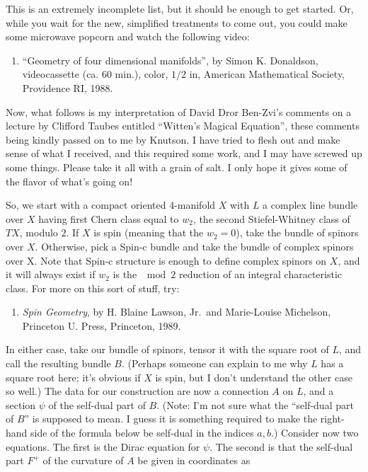 \documentclass{article}
\def\tightlist{}
\begin{document}
This is an extremely incomplete list, but it should be enough to get
started. Or, while you wait for the new, simplified treatments to come
out, you could make some microwave popcorn and watch the following
video:

\begin{enumerate}
\def\labelenumi{\arabic{enumi})}
\setcounter{enumi}{1}
\tightlist
\item
  ``Geometry of four dimensional manifolds'', by Simon K. Donaldson,
  videocassette (ca. 60 min.), color, \(1/2\) in, American Mathematical
  Society, Providence RI, 1988.
\end{enumerate}

Now, what follows is my interpretation of David Dror Ben-Zvi's comments
on a lecture by Clifford Taubes entitled ``Witten's Magical Equation'',
these comments being kindly passed on to me by Knutson. I have tried to
flesh out and make sense of what I received, and this required some
work, and I may have screwed up some things. Please take it all with a
grain of salt. I only hope it gives some of the flavor of what's going
on!

So, we start with a compact oriented 4-manifold \(X\) with \(L\) a
complex line bundle over \(X\) having first Chern class equal to
\(w_2\), the second Stiefel-Whitney class of \(TX\), modulo \(2\). If
\(X\) is spin (meaning that the \(w_2 = 0\)), take the bundle of spinors
over \(X\). Otherwise, pick a Spin-c bundle and take the bundle of
complex spinors over X. Note that Spin-c structure is enough to define
complex spinors on \(X\), and it will always exist if \(w_2\) is the
\(\mod 2\) reduction of an integral characteristic class. For more on
this sort of stuff, try:

\begin{enumerate}
\def\labelenumi{\arabic{enumi})}
\setcounter{enumi}{2}
\tightlist
\item
  \emph{Spin Geometry}, by H. Blaine Lawson, Jr.~and Marie-Louise
  Michelson, Princeton U. Press, Princeton, 1989.
\end{enumerate}

In either case, take our bundle of spinors, tensor it with the square
root of \(L\), and call the resulting bundle \(B\). (Perhaps someone can
explain to me why \(L\) has a square root here; it's obvious if \(X\) is
spin, but I don't understand the other case so well.) The data for our
construction are now a connection \(A\) on \(L\), and a section \(\psi\)
of the self-dual part of \(B\). (Note: I'm not sure what the ``self-dual
part of \(B\)'' is supposed to mean. I guess it is something required to
make the right-hand side of the formula below be self-dual in the
indices \(a,b\).) Consider now two equations. The first is the Dirac
equation for \(\psi\). The second is that the self-dual part \(F^+\) of
the curvature of \(A\) be given in coordinates as
\end{document}
